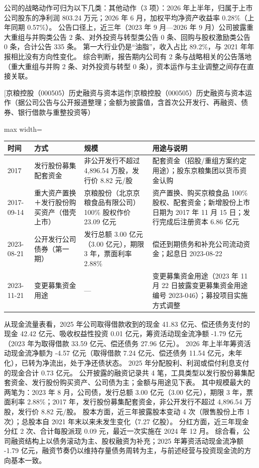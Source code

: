  公司的战略动作可归为以下几类：其他动作（3 项）：2026 年上半年，归属于上市公司股东的净利润 803.24 万元；2026 年 6 月，加权平均净资产收益率 0.28\%（上年同期 0.57\%）。 公告口径上，近三年（2023 年 9 月---2026 年 9 月）公司披露重大重组与并购类公告 2 条、对外投资与转型类公告 0 条、回购与股权激励类公告 0 条，合计公告 335 条。 第一大行业仍是“油脂”，收入占比 89.2\%，与 2021 年年报相比没有方向性变化。 综合判断，报告期内公司有 2 条与战略相关的公告落地（重大重组与并购 2 条、对外投资与转型 0 条），资本运作与主业调整之间存在直接关联。

\begin{center}\small\setlength{\tabcolsep}{4pt}
[京粮控股（000505）历史融资与资本运作]{京粮控股（000505）历史融资与资本运作（据公司公告与公开报道整理；金额为披露值，含首次公开发行、再融资、债券、银行借款与重整投资等）}
\begin{adjustbox}{max width=\textwidth}
\begin{tabular}{@{}p{1.45cm}p{2.55cm}p{4.05cm}p{4.95cm}@{}}
\toprule
时间 & 方式 & 规模 & 用途与说明 \\
\midrule
2017 & 发行股份募集配套资金 & 非公开发行不超过 4,\allowbreak{}896.54 万股，\allowbreak{}发行价 8.82 元/\allowbreak{}股 & 配套资金（招股/\allowbreak{}重组方案约定用途）；股东京粮集团以货币资金认购 \\
2017-09-14 & 重大资产置换＋发行股份购买资产（借壳上市） & 京粮股份（北京京粮食品有限公司）100\% 股权作价 23.09 亿元 & 资产置换、\allowbreak{}购买京粮食品 100\% 股权、\allowbreak{}配套资金；新增股份上市日期为 2017 年 11 月 15 日；发行完成后注册资本 6.86 亿元 \\
2023-08-21 & 公开发行公司债券（第一期） & 发行总额 3.00 亿元（3.00 亿元），\allowbreak{}期限 3 年，\allowbreak{}票面利率 2.88\% & 偿还到期债务和补充公司流动资金；起息日 2023-08-22 \\
2023-11-21 & 变更募集资金用途 & --- & 变更募集资金用途（2023 年 11 月 22 日披露变更募集资金用途编号 2023-046）；募投项目实施方式调整 \\
\bottomrule
\end{tabular}
\end{adjustbox}
\end{center}

 从现金流量表看，2025 年公司取得借款收到的现金 41.83 亿元、偿还债务支付的现金 42.42 亿元、吸收权益性投资 0.01 亿元，筹资活动现金流净额 -1.79 亿元（2023 年为取得借款 33.59 亿元、偿还债务 27.96 亿元）。 2026 年上半年筹资活动现金流净额为 -4.57 亿元（取得借款 7.24 亿元、偿还债务 11.54 亿元，未年化），已转为净流出，处于净还债状态。 2025 年分配股利、利润或偿付利息支付的现金合计 0.73 亿元。 公开披露的融资记录共 4 笔，工具类型以发行股份募集配套资金、发行股份购买资产、公司债为主；金额与用途见下表。 其中规模最大的两笔为：2023 年 8 月，公司债，发行总额 3.00 亿元（3.00 亿元），期限 3 年，票面利率 2.88\%；2017 年，发行股份募集配套资金，非公开发行不超过 4,896.54 万股，发行价 8.82 元/股。 股本方面，近三年披露股本变动 4 次（限售股份上市 1 次）；总股本自 2021 年末以来未发生变化（7.27 亿股）。 分红方面，近三年现金分红 2 次、合计每股派现 0.09 元，最近一次实施在 2024 年 12 月。 综合看，公司融资结构上以债务滚动为主、股权融资为补充；2025 年筹资活动现金流净额 -1.79 亿元，融资节奏仍以维持存量债务周转为主，与前述经营与投资现金流的方向基本一致。

